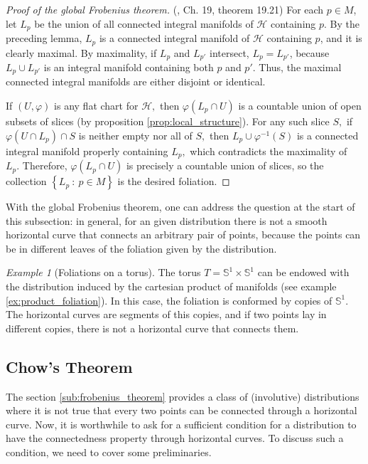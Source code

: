 \documentclass[12pt, letterpaper, reqno]{amsart}
\theoremstyle{definition}
\theoremstyle{plain}
\theoremstyle{remark}
\newtheorem{ex}{Example}
\begin{document}
\begin{proof}[Proof of the global Frobenius theorem]
	(\cite{lee2003introduction}, Ch. 19, theorem 19.21) For each $ p\in M $, let $ L_p $ be the union of all connected integral manifolds of $ \mathcal{H} $ containing $ p. $ By the preceding lemma, $ L_p $ is a connected integral manifold of $ \mathcal{H} $ containing $ p $, and it is clearly maximal. By maximality, if $ L_p $ and $ L_{p'} $ intersect, $ L_p=L_{p'} $, because $ L_p\cup L_{p'} $ is an integral manifold containing both $ p $ and $ p' $. Thus, the maximal connected integral manifolds are either disjoint or identical.    

	If $ (U,\varphi) $ is any flat chart for $ \mathcal{H}, $ then $ \varphi(L_p\cap U) $ is a countable union of open subsets of slices (by proposition \ref{prop:local_structure}). For any such slice $ S, $ if $ \varphi(U\cap L_p)\cap S $ is neither empty nor all of $ S, $ then $ L_p\cup \varphi^{-1}(S )$ is a connected integral manifold properly containing $ L_p, $ which contradicts the maximality of $ L_p. $ Therefore, $ \varphi(L_p\cap U) $ is precisely a countable union of slices, so the collection $ \left\{ L_p\ : \ p\in M \right\} $ is the desired foliation.
\end{proof}

With the global Frobenius theorem, one can address the question at the start of this subsection: in general, for an given distribution there is not a smooth horizontal curve that connects an arbitrary pair of points, because the points can be in different leaves of the foliation given by the distribution.

\begin{ex}[Foliations on a torus]
	The torus $ T= \mathbb{S}^1\times \mathbb{S}^1 $ can be endowed with the distribution induced by the cartesian product of manifolds (see example \ref{ex:product_foliation}). In this case, the foliation is conformed by copies of $ \mathbb{S}^1. $ The horizontal curves are segments of this copies, and if two points lay in different copies, there is not a horizontal curve that connects them.
\end{ex}

\subsection{Chow's Theorem}%
\label{sub:chow_s_theorem}

The section \ref{sub:frobenius_theorem} provides a class of (involutive) distributions where it is not true that every two points can be connected through a horizontal curve.  Now, it is worthwhile to ask for a sufficient condition for a distribution to have the connectedness property through horizontal curves. To discuss such a condition, we need to cover some preliminaries. 
\end{document}
